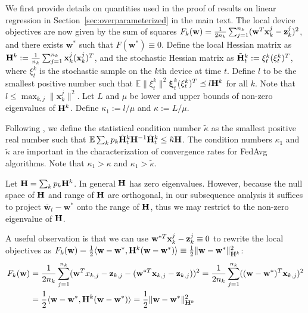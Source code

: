 We first provide details on quantities used in the proof of results on linear regression in Section~\ref{sec:overparameterized} in the main text. The local device objectives are now given by the sum of squares {\small$F_{k}(\mathbf{w})=\frac{1}{2n_{k}}\sum_{j=1}^{n_{k}}(\mathbf{w}^{T}\mathbf{x}_{k}^{j}-{\mathbf{z}}_{k}^{j})^{2}$},
and there exists $\mathbf{w}^{\ast}$ such that $F(\mathbf{w}^{\ast})\equiv0$. 
Define the local Hessian matrix as ${\mathbf{H}}^{k}:=\frac{1}{n_{k}}\sum_{j=1}^{n_{k}}\mathbf{x}_{k}^{j}(\mathbf{x}_{k}^{j})^{T}$, and the stochastic Hessian matrix as $\tilde{{\mathbf{H}}}_{t}^{k}:=\xi_{t}^{k}(\xi_{t}^{k})^{T}$, where $\xi_{t}^{k}$ is the stochastic sample on the $k$th device at
time $t$. Define $l$ to be the smallest positive number such that $\mathbb{E}\|\xi_{t}^{k}\|^{2}$$\mathbf{\xi}_{t}^{k}$($\mathbf{\xi}_{t}^{k})^{T}\preceq l{\mathbf{H}}^{k}$ for all $k$. Note that $l\leq\max_{k,j}\|\mathbf{x}_{k}^{j}\|^{2}$.
Let $L$ and $\mu$ be lower and upper bounds of non-zero eigenvalues
of ${\mathbf{H}}^{k}$. Define $\kappa_{1}:=l/\mu$ and $\kappa:=L/\mu$. 

Following
\cite{liu2018accelerating,jain2017accelerating}, we define the statistical
condition number $\tilde{\kappa}$ as the smallest positive real number
such that $\mathbb{E}\sum_{k}p_{k}\tilde{{\mathbf{H}}}_{t}^{k}{\mathbf{H}}^{-1}\tilde{{\mathbf{H}}}_{t}^{k}\leq\tilde{\kappa}{\mathbf{H}}$. 
The condition numbers $\kappa_{1}$ and $\tilde{\kappa}$
are important in the characterization of convergence rates for FedAvg
algorithms. Note that $\kappa_{1}>\kappa$ and $\kappa_{1}>\tilde{\kappa}$.


Let ${\mathbf{H}}=\sum_{k}p_k{\mathbf{H}}^k$. In general ${\mathbf{H}}$ has zero eigenvalues. However, because the null space
of ${\mathbf{H}}$ and range of ${\mathbf{H}}$ are orthogonal, in our subsequence analysis
it suffices to project $\overline{\mathbf{w}}_{t}-\mathbf{w}^{\ast}$
onto the range of ${\mathbf{H}}$, thus we may restrict to the non-zero eigenvalue
of ${\mathbf{H}}$. 

A useful observation is that we can use $\mathbf{w}^{\ast T}\mathbf{x}_{k}^{j}-{\mathbf{z}}_{k}^{j}\equiv0$
to rewrite the local objectives as $F_{k}(\mathbf{w})=\frac{1}{2}\langle\mathbf{w}-\mathbf{w}^{\ast},{\mathbf{H}}^{k}(\mathbf{w}-\mathbf{w}^{\ast})\rangle\equiv\frac{1}{2}\|\mathbf{w}-\mathbf{w}^{\ast}\|_{{\mathbf{H}}^{k}}^{2}$:
\begin{align*}
F_{k}({\mathbf{w}}) & =\frac{1}{2n_{k}}\sum_{j=1}^{n_{k}}({\mathbf{w}}^{T}x_{k,j}-{\mathbf{z}}_{k,j}-({\mathbf{w}}^{\ast T}{\mathbf{x}}_{k,j}-{\mathbf{z}}_{k,j}))^{2}=\frac{1}{2n_{k}}\sum_{j=1}^{n_{k}}(({\mathbf{w}}-{\mathbf{w}}^{\ast})^{T}{\mathbf{x}}_{k,j})^{2}\\
& =\frac{1}{2}\langle {\mathbf{w}}-{\mathbf{w}}^{\ast},{\mathbf{H}}^{k}({\mathbf{w}}-{\mathbf{w}}^{\ast})\rangle=\frac{1}{2}\|{\mathbf{w}}-{\mathbf{w}}^{\ast}\|_{{\mathbf{H}}^{k}}^{2}
\end{align*}

